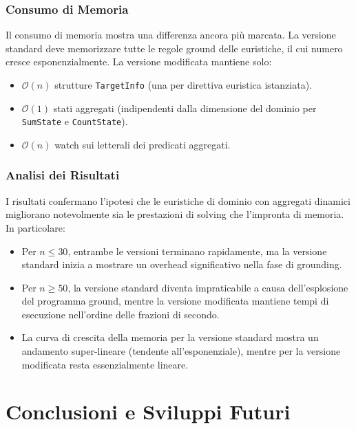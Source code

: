 \documentclass[a4paper,12pt,twoside,openright]{report}
\begin{document}
\subsection{Consumo di Memoria}

Il consumo di memoria mostra una differenza ancora pi\`{u} marcata. La versione standard deve memorizzare tutte le regole ground delle euristiche, il cui numero cresce esponenzialmente. La versione modificata mantiene solo:
\begin{itemize}
    \item $\mathcal{O}(n)$ strutture \texttt{TargetInfo} (una per direttiva euristica istanziata).
    \item $\mathcal{O}(1)$ stati aggregati (indipendenti dalla dimensione del dominio per \texttt{SumState} e \texttt{CountState}).
    \item $\mathcal{O}(n)$ watch sui letterali dei predicati aggregati.
\end{itemize}

\subsection{Analisi dei Risultati}

I risultati confermano l'ipotesi che le euristiche di dominio con aggregati dinamici migliorano notevolmente sia le prestazioni di solving che l'impronta di memoria. In particolare:

\begin{itemize}
    \item Per $n \leq 30$, entrambe le versioni terminano rapidamente, ma la versione standard inizia a mostrare un overhead significativo nella fase di grounding.
    \item Per $n \geq 50$, la versione standard diventa impraticabile a causa dell'esplosione del programma ground, mentre la versione modificata mantiene tempi di esecuzione nell'ordine delle frazioni di secondo.
    \item La curva di crescita della memoria per la versione standard mostra un andamento super-lineare (tendente all'esponenziale), mentre per la versione modificata resta essenzialmente lineare.
\end{itemize}

\chapter{Conclusioni e Sviluppi Futuri}
\label{ch:conclusioni}
\end{document}
